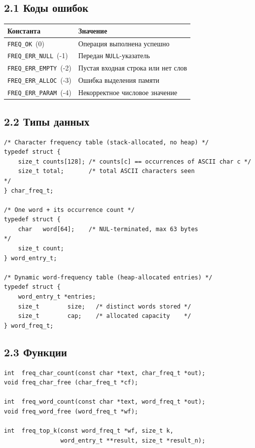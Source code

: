 \subsection*{2.1 Коды ошибок}

\begin{center}
\begin{tabular}{ll}
\toprule
Константа & Значение \\
\midrule
\texttt{FREQ\_OK}~(0)       & Операция выполнена успешно \\
\texttt{FREQ\_ERR\_NULL}~(-1)  & Передан \texttt{NULL}-указатель \\
\texttt{FREQ\_ERR\_EMPTY}~(-2) & Пустая входная строка или нет слов \\
\texttt{FREQ\_ERR\_ALLOC}~(-3) & Ошибка выделения памяти \\
\texttt{FREQ\_ERR\_PARAM}~(-4) & Некорректное числовое значение \\
\bottomrule
\end{tabular}
\end{center}

\subsection*{2.2 Типы данных}

\begin{lstlisting}[style=Cstyle]
/* Character frequency table (stack-allocated, no heap) */
typedef struct {
    size_t counts[128]; /* counts[c] == occurrences of ASCII char c */
    size_t total;       /* total ASCII characters seen               */
} char_freq_t;

/* One word + its occurrence count */
typedef struct {
    char   word[64];    /* NUL-terminated, max 63 bytes              */
    size_t count;
} word_entry_t;

/* Dynamic word-frequency table (heap-allocated entries) */
typedef struct {
    word_entry_t *entries;
    size_t        size;   /* distinct words stored */
    size_t        cap;    /* allocated capacity    */
} word_freq_t;
\end{lstlisting}

\subsection*{2.3 Функции}

\begin{lstlisting}[style=Cstyle]
int  freq_char_count(const char *text, char_freq_t *out);
void freq_char_free (char_freq_t *cf);

int  freq_word_count(const char *text, word_freq_t *out);
void freq_word_free (word_freq_t *wf);

int  freq_top_k(const word_freq_t *wf, size_t k,
                word_entry_t **result, size_t *result_n);
\end{lstlisting}

